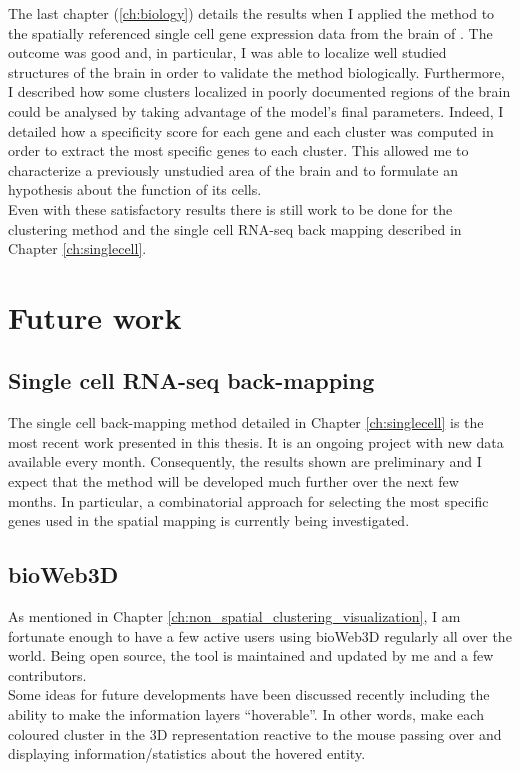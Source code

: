  The last chapter (\ref{ch:biology}) details the results when I applied the method to the spatially referenced single cell gene expression data from the brain of \platyfull{}. The outcome was good and, in particular, I was able to localize well studied structures of the brain in order to validate the method biologically. Furthermore, I described how some clusters localized in poorly documented regions of the brain could be analysed by taking advantage of the model's final parameters. Indeed, I detailed how a specificity score for each gene and each cluster was computed in order to extract the most specific genes to each cluster. This allowed me to characterize a previously unstudied area of the brain and to formulate an hypothesis about the function of its cells. \\
 
  Even with these satisfactory results there is still work to be done for the clustering method and the single cell RNA-seq back mapping described in Chapter \ref{ch:singlecell}.\\
  
\section{Future work}


  \subsection{Single cell RNA-seq back-mapping}
  The single cell back-mapping method detailed in Chapter \ref{ch:singlecell} is the most recent work presented in this thesis. It is an ongoing project with new data available every month. Consequently, the results shown are preliminary and I expect that the method will be developed much further over the next few months. In particular, a combinatorial approach for selecting the most specific genes used in the spatial mapping is currently being investigated.
  
  \subsection{bioWeb3D}
  As mentioned in Chapter \ref{ch:non_spatial_clustering_visualization}, I am fortunate enough to have a few active users using bioWeb3D regularly all over the world. Being open source, the tool is maintained and updated by me and a few contributors.\\
  
   Some ideas for future developments have been discussed recently including the ability to make the information layers ``hoverable''. In other words, make each coloured cluster in the 3D representation reactive to the mouse passing over and displaying information/statistics about the hovered entity.\\
   
